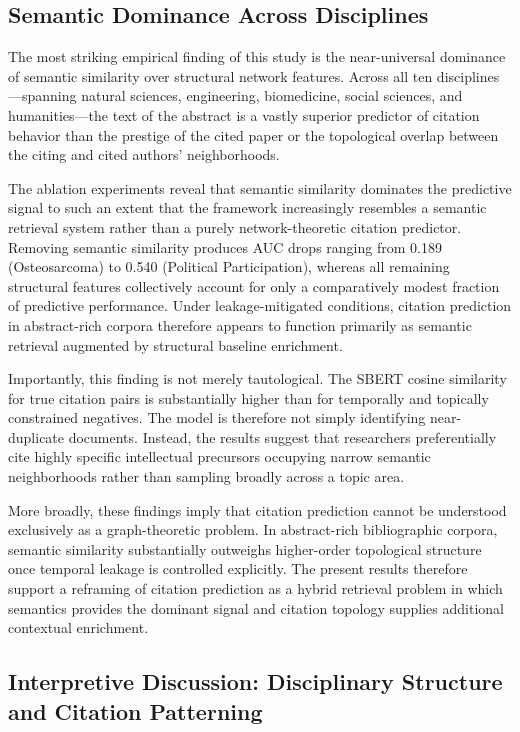 \documentclass[11pt,a4paper]{article}
\begin{document}
\subsection{Semantic Dominance Across Disciplines}

The most striking empirical finding of this study is the near-universal dominance of semantic similarity over structural network features. Across all ten disciplines---spanning natural sciences, engineering, biomedicine, social sciences, and humanities---the text of the abstract is a vastly superior predictor of citation behavior than the prestige of the cited paper or the topological overlap between the citing and cited authors' neighborhoods.

The ablation experiments reveal that semantic similarity dominates the predictive signal to such an extent that the framework increasingly resembles a semantic retrieval system rather than a purely network-theoretic citation predictor. Removing semantic similarity produces AUC drops ranging from 0.189 (Osteosarcoma) to 0.540 (Political Participation), whereas all remaining structural features collectively account for only a comparatively modest fraction of predictive performance. Under leakage-mitigated conditions, citation prediction in abstract-rich corpora therefore appears to function primarily as semantic retrieval augmented by structural baseline enrichment.

Importantly, this finding is not merely tautological. The SBERT cosine similarity for true citation pairs is substantially higher than for temporally and topically constrained negatives. The model is therefore not simply identifying near-duplicate documents. Instead, the results suggest that researchers preferentially cite highly specific intellectual precursors occupying narrow semantic neighborhoods rather than sampling broadly across a topic area.

More broadly, these findings imply that citation prediction cannot be understood exclusively as a graph-theoretic problem. In abstract-rich bibliographic corpora, semantic similarity substantially outweighs higher-order topological structure once temporal leakage is controlled explicitly. The present results therefore support a reframing of citation prediction as a hybrid retrieval problem in which semantics provides the dominant signal and citation topology supplies additional contextual enrichment.

\subsection{Interpretive Discussion: Disciplinary Structure and Citation Patterning}
\end{document}
